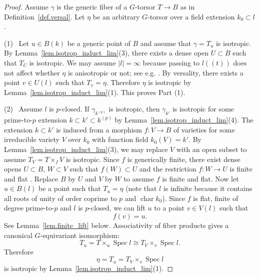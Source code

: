 \documentclass[12pt]{amsart}
\numberwithin{equation}{section}
\theoremstyle{definition}
\newcommand{\Spec}{\operatorname{Spec}}
\newcommand{\Char}{\operatorname{char}}
\begin{document}
\begin{proof}
    Assume $\gamma$ is the generic fiber of a $G$-torsor $T\to B$ as in Definition~\ref{def.versal}. Let $\eta$ be an arbitrary $G$-torsor over a field extension $k_0\subset l$. 

    (1) \   Let $u\in B(k)$ be a generic point of $B$ and assume that $\gamma = T_u$ is isotropic.  By Lemma~\ref{lem.isotrop_induct_lim}(3), there exists a dense open $U\subset B$ such that $T_U$ is isotropic. We may assume $|l|=\infty$ because passing to $l(\!(t)\!)$ does not affect whether $\eta$ is anisotropic or not; see e.g. \cite[Proposition 4.9]{gille2024newloop}. By versality, there exists a point $v\in U(l)$ such that $T_{v} = \eta$. Therefore $\eta$ is isotropic by Lemma~\ref{lem.isotrop_induct_lim}(1). This proves Part (1). 

\smallskip
    (2) \ Assume $l$ is $p$-closed. If $\gamma_{k^{(p)}}$ is isotropic, then $\gamma_{k'}$ is isotropic for some prime-to-$p$ extension $k\subset k'\subset k^{(p)}$ by Lemma~\ref{lem.isotrop_induct_lim}(4). The extension $k\subset k'$ is induced from a morphism $f: V \to B$ of varieties for some irreducible variety $V$ over $k_0$ with function field $k_0(V)=k'$. By Lemma~\ref{lem.isotrop_induct_lim}(3), we may replace $V$ with an open subset to assume $T_{V} = T\times_f V$ is isotropic.  Since $f$ is generically finite, there exist dense opens $U\subset B$, $W\subset V$ such that $f(W)\subset U$ and the restriction $f:W\to U$ is finite and flat \cite[Tag 02NX]{stacks-project}. Replace $B$ by $U$ and $V$ by $W$ to assume $f$ is finite and flat.
    Now let $u\in B(l)$ be a point such that $T_u = \eta$ (note that $l$ is infinite because it contains all roots of unity of order coprime to $p$ and $\Char k_0$). Since $f$ is flat, finite of degree prime-to-$p$ and $l$ is $p$-closed, we can lift $u$ to a point $v\in V(l)$ such that $$f(v) = u.$$ 
    See Lemma~\ref{lem.finite_lift} below. Associativity of fiber products gives a canonical $G$-equivariant isomorphism:
    $$T_u =T \times_{u} \Spec l \cong T_{V} \times_v \Spec l.$$
    Therefore $$\eta = T_u = T_{V}\times_{v} \Spec l$$ is isotropic by Lemma~\ref{lem.isotrop_induct_lim}(1).
\end{proof}
\end{document}
